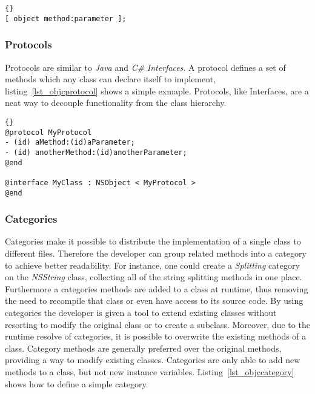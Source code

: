 \begin{lstlisting}[captionpos=b, caption=An Objective-C message send,
label=lst_objcmsgsend]{}
[ object method:parameter ];
\end{lstlisting}

\subsubsection{Protocols}
Protocols are similar to \textit{Java} and \textit{C\#} \textit{Interfaces}.
A protocol defines a set of methods which any class can declare itself to
implement, listing~\ref{lst_objcprotocol} shows a simple exmaple. Protocols,
like Interfaces, are a neat way to decouple functionality from the class
hierarchy.

\begin{lstlisting}[captionpos=b, caption=An Objective-C protocol and a
class adopting it.,
label=lst_objcprotocol]{}
@protocol MyProtocol
- (id) aMethod:(id)aParameter;
- (id) anotherMethod:(id)anotherParameter;
@end

@interface MyClass : NSObject < MyProtocol >
@end
\end{lstlisting}

\subsubsection{Categories}
Categories make it possible to distribute the implementation of a single class
to different files. Therefore the developer can group related methods into a
category to achieve better readability. For instance, one could create a
\textit{Splitting} category on the \textit{NSString} class, collecting all of
the string splitting methods in one place.
Furthermore a categories methods are added to a class at runtime, thus
removing the need to recompile that class or even have access to its source
code. By using categories the developer is given a tool to extend existing
classes without resorting to modify the original class or to create a subclass.
Moreover, due to the runtime resolve of categories, it is possible to overwrite
the existing methods of a class. Category methods are generally preferred over
the original methods, providing a way to modify existing classes. Categories are
only able to add new methods to a class, but not new instance variables.
Listing~\ref{lst_objccategory} shows how to define a simple category.

